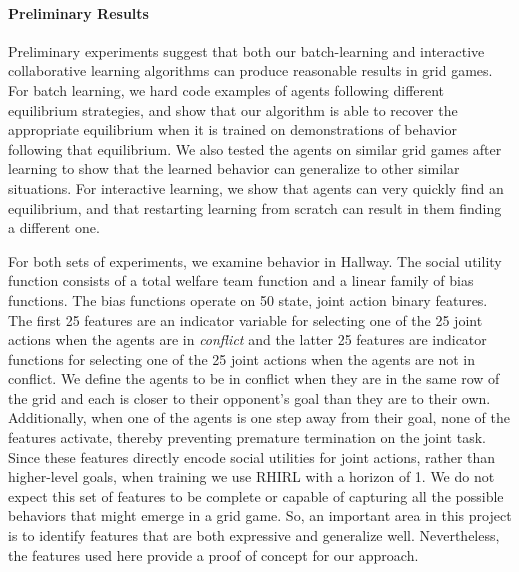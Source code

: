 
\vspace{\up}
\paragraph{Preliminary Results}
\label{sec:results}

Preliminary experiments suggest that both our batch-learning and
interactive collaborative learning algorithms can produce reasonable
results in grid games.  For batch learning, we hard code examples of
agents following different equilibrium strategies, and show that our
algorithm is able to recover the appropriate equilibrium when it is
trained on demonstrations of behavior following that equilibrium.  We
also tested the agents on similar grid games after learning to show
that the learned behavior can generalize to other similar situations.
For interactive learning, we show that agents can very quickly
find an equilibrium, and that restarting learning from scratch can
result in them finding a different one.

For both sets of experiments, we examine behavior in Hallway.  The
social utility function consists of a total welfare team 
function and a linear family of bias functions. The bias functions
operate on 50 state, joint action binary features. The first 25
features are an indicator variable for selecting one of the 25 joint
actions when the agents are in {\em conflict\/} and the latter 25
features are indicator functions for selecting one of the 25 joint
actions when the agents are not in conflict. We define the agents to be
in conflict when they are in the same row of the grid and each is
closer to their opponent's goal than they are to their
own. Additionally, when one of the agents is one step away from their
goal, none of the features activate, thereby preventing premature
termination on the joint task. Since these features directly encode
social utilities for joint actions, rather than higher-level goals, when
training we use RHIRL with a horizon of 1. We do not expect this
set of features to be complete or capable of capturing all the
possible behaviors that might emerge in a grid game. So, an important
area in this project is to identify features that are both expressive
and generalize well. Nevertheless, the features used here provide a
proof of concept for our approach.

